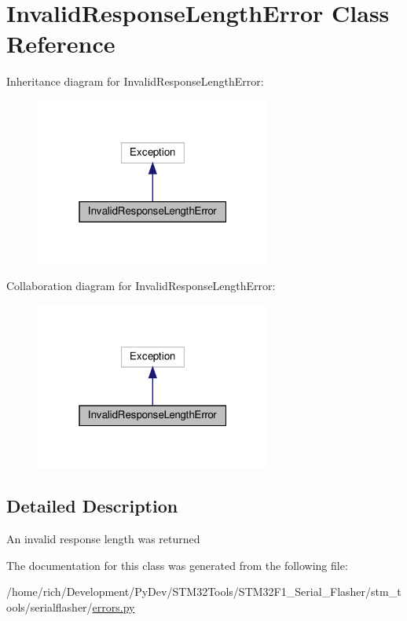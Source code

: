 \hypertarget{classstm__tools_1_1serialflasher_1_1errors_1_1InvalidResponseLengthError}{}\section{Invalid\+Response\+Length\+Error Class Reference}
\label{classstm__tools_1_1serialflasher_1_1errors_1_1InvalidResponseLengthError}


Inheritance diagram for Invalid\+Response\+Length\+Error\+:
\nopagebreak
\begin{figure}[H]
\begin{center}
\leavevmode
\includegraphics[width=220pt]{classstm__tools_1_1serialflasher_1_1errors_1_1InvalidResponseLengthError__inherit__graph}
\end{center}
\end{figure}


Collaboration diagram for Invalid\+Response\+Length\+Error\+:
\nopagebreak
\begin{figure}[H]
\begin{center}
\leavevmode
\includegraphics[width=220pt]{classstm__tools_1_1serialflasher_1_1errors_1_1InvalidResponseLengthError__coll__graph}
\end{center}
\end{figure}


\subsection{Detailed Description}
\begin{DoxyVerb}An invalid response length was returned\end{DoxyVerb}
 

The documentation for this class was generated from the following file\+:\begin{DoxyCompactItemize}
\item 
/home/rich/\+Development/\+Py\+Dev/\+S\+T\+M32\+Tools/\+S\+T\+M32\+F1\+\_\+\+Serial\+\_\+\+Flasher/stm\+\_\+tools/serialflasher/\hyperlink{errors_8py}{errors.\+py}\end{DoxyCompactItemize}
